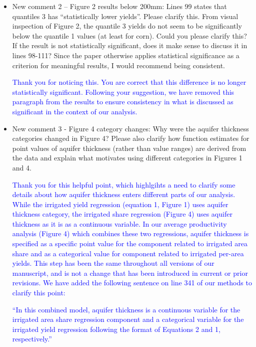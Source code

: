 \documentclass[
]{article}
\begin{document}
\begin{itemize}
\item New comment 2 – Figure 2 results below 200mm: Lines 99 states that quantiles 3 has ``statistically lower yields''. Please clarify this. From visual inspection of Figure 2, the quantile 3 yields do not seem to be significantly below the quantile 1 values (at least for corn). Could you please clarify this? If the result is not statistically significant, does it make sense to discuss it in lines 98-111? Since the paper otherwise applies statistical significance as a criterion for meaningful results, I would recommend being consistent.


    \textcolor{blue}{Thank you for noticing this. You are correct that this difference is no longer statistically significant. Following your suggestion, we have removed this paragraph from the results to ensure consistency in what is discussed as significant in the context of our analysis.}

\item New comment 3 - Figure 4 category changes: Why were the aquifer thickness categories changed in Figure 4? Please also clarify how function estimates for point values of aquifer thickness (rather than value ranges) are derived from the data and explain what motivates using different categories in Figures 1 and 4.


    \textcolor{blue}{Thank you for this helpful point, which highlgihts a need to clarify some details about how aquifer thickness enters different parts of our analysis. While the irrigated yield regression (equation 1, Figure 1) uses aquifer thickness category, the irrigated share regression (Figure 4) uses aquifer thickness as it is as a continuous variable. In our average productivity analysis (Figure 4) which combines these two regressions, aquifer thickness is specified as a specific point value for the component related to irrigated area share and as a categorical value for component related to irrigated per-area yields. This step has been the same throughout all versions of our manuscript, and is not a change that has been introduced in current or prior revisions. We have added the following sentence on line 341 of our methods to clarify this point:}

    \textcolor{blue}{``In this combined model, aquifer thickness is a continuous variable for the irrigated area share regression component and a categorical variable for the irrigated yield regression following the format of Equations 2 and 1, respectively.''}
    

\end{itemize}
\end{document}
